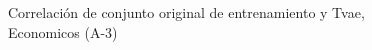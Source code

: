\begin{figure}[H]
    \centering
    
    \caption{Correlación de conjunto original de entrenamiento y Tvae, Economicos (A-3)}
    \label{pairwise-economicos-a-3-tvae}
\end{figure}